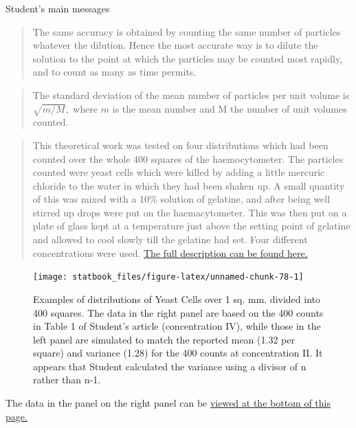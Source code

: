 \documentclass[]{book}
\begin{document}
Student's main messages

\begin{quote}
The same accuracy is obtained by counting the same number of
particles whatever the dilution. Hence the most accurate way is to dilute the solution to the point at which the particles may be counted most rapidly, and to count as many as time permits.
\end{quote}

\begin{quote}
The standard deviation of the mean number of particles per unit volume is \(\sqrt{m/M},\) where \(m\) is the mean number and M the number of unit volumes counted.
\end{quote}

\begin{quote}
This theoretical work was tested on four distributions which had been counted over the whole 400 squares of the haemocytometer. The particles counted were yeast cells which were killed by adding a little mercuric chloride to the water in which they had been shaken up. A small quantity of this was mixed with a 10\% solution of gelatine, and after being well stirred up drops were put on the haemacytometer. This was then put on a plate of glass kept at a temperature just above the setting point of gelatine and allowed to cool slowly till the gelatine had set. Four different concentrations were used. \href{http://www.medicine.mcgill.ca/epidemiology/hanley/bios601/Intensity-Rate/Student_counting.pdf\#page=6}{The full description can be found here.}
\end{quote}

\begin{figure}

\texttt{[image: statbook\_files/figure-latex/unnamed-chunk-78-1]} \hfill{}

\caption{Examples of distributions of Yeast Cells over 1 sq. mm. divided into 400 squares. The data in the right panel are based on the 400 counts in Table 1 of Student's article (concentration IV), while those in the left panel are simulated to match the reported mean (1.32 per square) and variance (1.28) for the 400 counts at concentration II. It appears that Student calculated the variance using a divisor of n rather than n-1.}\label{fig:unnamed-chunk-78}
\end{figure}

The data in the panel on the right panel can be \href{http://www.medicine.mcgill.ca/epidemiology/hanley/bios601/Intensity-Rate/Student_counting.pdf\#page=10}{viewed at the bottom of this page.}
\end{document}
